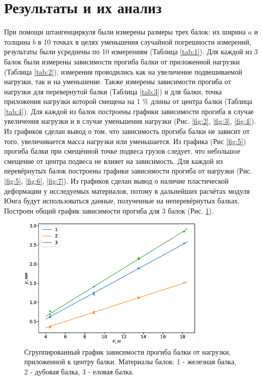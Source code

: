 \documentclass[12pt]{article}
\begin{document}
\section{Результаты и их анализ}
При помощи штангенциркуля были измерены размеры трех балок: их ширина $a$ и толщина $b$ в 10 точках в целях уменьшения случайной погрешности измерений, 
результаты были усреднены по 10 измерениям (Таблица \ref{tab:1}). Для каждой из 3 балок были измерены зависимости прогиба балки от приложенной
нагрузки (Таблица \ref{tab:2}), измерения проводились как на увеличение подвешиваемой нагрузки, так и на уменьшение. 
Также измерены зависимости прогиба от нагрузки для перевернутой балки (Таблица \ref{tab:3}) и для балки, 
точка приложения нагрузки которой смещена на 1 \% длины от центра балки (Таблица \ref{tab:4}). Для каждой из балок построены графики зависимости прогиба в 
случае увеличения нагрузки и в случае уменьшения нагрузки (Рис. \ref{fig:2}, \ref{fig:3}, \ref{fig:4}). 
Из графиков сделан вывод о том, что зависимость прогиба балки не зависит от того, увеличивается масса нагрузки или уменьшается. 
Из графика (Рис \ref{fig:5}) прогиба балки при смещённой точке подвеса грузов следует, что небольшое смещение от центра подвеса не влияет на зависимость.
Для каждой из перевёрнутых балок построены графики зависимости прогиба от нагрузки (Рис. \ref{fig:5}, \ref{fig:6}, \ref{fig:7}). Из графиков сделан
вывод о наличие пластической деформации у исследуемых материалов, потому в дальнейших расчётах модуля Юнга будут использоваться данные, полученные
на неперевёрнутых балках.
Построен общий график зависимости прогиба для 3 балок (Рис. \ref{fig:9}).
\begin{figure}[H]
    \begin{center}
        \includegraphics[width=0.8\textwidth]{gr123.eps}
    \end{center}
    \caption{Сгруппированный график зависимости прогиба балки от нагрузки, приложенной к центру балки. Материалы балок: 1 - железная балка, 
    2 - дубовая балка, 3 - еловая балка.}
    \label{fig:9}
\end{figure}
\end{document}
